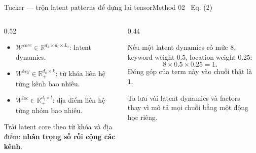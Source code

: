 \begin{frame}[shrink=34]{Tucker --- trộn latent patterns để dựng lại tensor}{Method 02 \textperiodcentered\ Eq. (2)}
\vspace{3mm}
\begin{columns}[T,onlytextwidth]
\begin{column}{0.52\textwidth}
\begin{mathcard}
  \begin{itemize}
    \item $\mathcal W^{core}\in\mathbb R^{d_k\times d_l\times L_c}$: latent dynamics.
    \item $W^{key}\in\mathbb R_+^{d_k\times k}$: từ khóa liên hệ từng kênh bao nhiêu.
    \item $W^{loc}\in\mathbb R_+^{d_l\times l}$: địa điểm liên hệ từng nhóm bao nhiêu.
  \end{itemize}
\end{mathcard}
\vspace{3mm}
\begin{takeaway}
  Trải latent core theo từ khóa và địa điểm: \textbf{nhân trọng số rồi cộng các kênh}.
\end{takeaway}
\end{column}
\begin{column}{0.44\textwidth}
\begin{intuition}
  Nếu một latent dynamics có mức $8$, keyword weight $0.5$, location weight $0.25$:
  \[8\times0.5\times0.25=1.\]
  Đóng góp của term này vào chuỗi thật là $1$.
\end{intuition}
\vspace{3mm}
\begin{questioncard}
  \par
  Ta lưu vài latent dynamics và factors thay vì mô tả mọi chuỗi bằng một động học riêng.
\end{questioncard}
\end{column}
\end{columns}
\vspace{2mm}
\end{frame}

